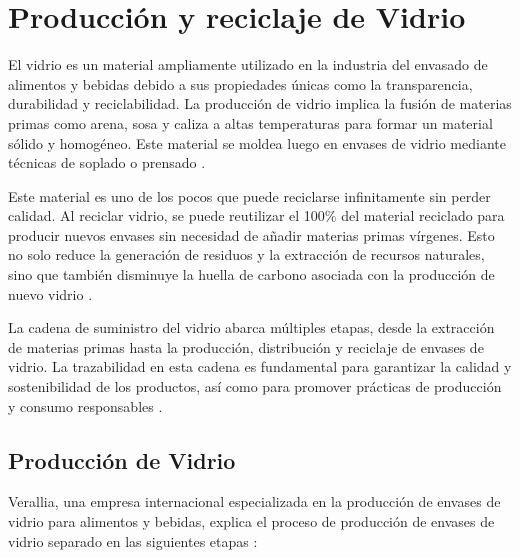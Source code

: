 \documentclass[main.tex]{subfiles}
\begin{document}
\section{Producción y reciclaje de Vidrio}

El vidrio es un material ampliamente utilizado en la industria del envasado de alimentos y bebidas debido a sus propiedades únicas como la transparencia, durabilidad y reciclabilidad. La producción de vidrio implica la fusión de materias primas como arena, sosa y caliza a altas temperaturas para formar un material sólido y homogéneo. Este material se moldea luego en envases de vidrio mediante técnicas de soplado o prensado \cite{verallia2022vidrio}.

Este material es uno de los pocos que puede reciclarse infinitamente sin perder calidad. Al reciclar vidrio, se puede reutilizar el 100\% del material reciclado para producir nuevos envases sin necesidad de añadir materias primas vírgenes. Esto no solo reduce la generación de residuos y la extracción de recursos naturales, sino que también disminuye la huella de carbono asociada con la producción de nuevo vidrio \cite{verallia2022vidrio}.

La cadena de suministro del vidrio abarca múltiples etapas, desde la extracción de materias primas hasta la producción, distribución y reciclaje de envases de vidrio. La trazabilidad en esta cadena es fundamental para garantizar la calidad y sostenibilidad de los productos, así como para promover prácticas de producción y consumo responsables \cite{verallia2022vidrio}.

\subsection{Producción de Vidrio}

Verallia, una empresa internacional especializada en la producción de envases de vidrio para alimentos y bebidas, explica el proceso de producción de envases de vidrio separado en las siguientes etapas \cite{prodvidrio2024verallia}:
\end{document}
